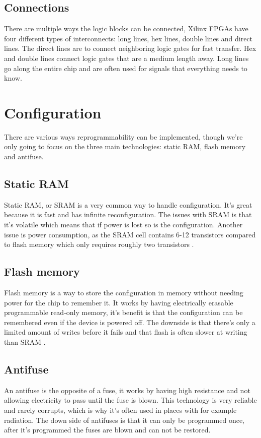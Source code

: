 \subsection{Connections}
There are multiple ways the logic blocks can be connected, Xilinx FPGAs have
four different types of interconnects: long lines, hex lines, double lines and
direct lines. The direct lines are to connect neighboring logic gates for fast
transfer. Hex and double lines connect logic gates that are a medium length
away. Long lines go along the entire chip and are often used for signals that
everything needs to know.


\section{Configuration}
There are various ways reprogrammability can be implemented, though we're only
going to focus on the three main technologies: static RAM, flash memory and
antifuse.

\subsection{Static RAM}
Static RAM, or SRAM is a very common way to handle configuration. It's great
because it is fast and has infinite reconfiguration. The issues with SRAM is
that it's volatile which means that if power is lost so is the configuration.
Another issue is power consumption, as the SRAM cell contains 6-12 transistors
compared to flash memory which only requires roughly two transistors
\cite{amano_principles_2018}.

\subsection{Flash memory}
Flash memory is a way to store the configuration in memory without needing
power for the chip to remember it. It works by having electrically erasable
programmable read-only memory, it's benefit is that the configuration can be
remembered even if the device is powered off. The downside is that there's only
a limited amount of writes before it fails and that flash is often slower at
writing than SRAM \cite{m_d_mano_digital_2012}.

\subsection{Antifuse}
An antifuse is the opposite of a fuse, it works by having high resistance and
not allowing electricity to pass until the fuse is blown. This technology is
very reliable and rarely corrupts, which is why it's often used in places with
for example radiation. The down side of antifuses is that it can only be
programmed once, after it's programmed the fuses are blown and can not be
restored.
